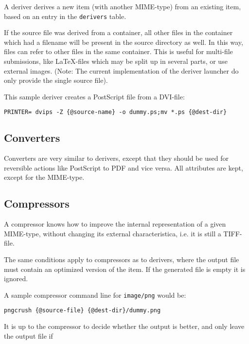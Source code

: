 A deriver derives a new item (with another MIME-type) from
an existing item, based on an entry in the \texttt{derivers}
table.  

If the source file was derived from a container, all other files in
the container which had a filename will be present in the source
directory as well.  In this way, files can refer to other files in the
same container.  This is useful for multi-file submissions, like
{\LaTeX}-files which may be split up in several parts, or use external
images.  (Note:  The current implementation of the deriver launcher do
only provide the single source file).

This sample deriver creates a PostScript file from a DVI-file:

\begin{verbatim}
PRINTER= dvips -Z {@source-name} -o dummy.ps;mv *.ps {@dest-dir}
\end{verbatim}



\subsection{Converters}

Converters are very similar to derivers, except that they should be
used for reversible actions like PostScript to PDF and vice versa.
All attributes are kept, except for the MIME-type.

\subsection{Compressors}

A compressor knows how to improve the internal
representation of a given MIME-type, without changing its
external characteristica, i.e. it is still a TIFF-file.

The same conditions apply to compressors as to derivers,
where the output file must contain an optimized version of
the item.  If the generated file is empty it is ignored.

A sample compressor command line for \texttt{image/png} would be:

\begin{verbatim}
pngcrush {@source-file} {@dest-dir}/dummy.png
\end{verbatim}

It is up to the compressor to decide whether the output is better, and
only leave the output file if 


